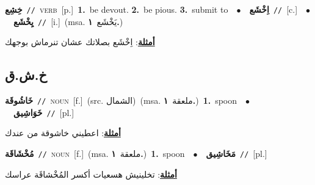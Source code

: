 \documentclass[10pt,a4paper,twoside]{article} %
\begin{document}
\begin{multicols}{2}
{\setlength\topsep{0pt}\textbf{\foreignlanguage{arabic}{خِشِع}}\ {\color{gray}\texttt{//}\color{black}}\ \textsc{verb}\ [p.]\ \textbf{1.}~be devout.  \textbf{2.}~be pious.  \textbf{3.}~submit to\ \ $\bullet$\ \ \setlength\topsep{0pt}\textbf{\foreignlanguage{arabic}{اِخْشَع}}\ {\color{gray}\texttt{//}\color{black}}\ [c.]\ \ $\bullet$\ \ \setlength\topsep{0pt}\textbf{\foreignlanguage{arabic}{يِخْشَع}}\ {\color{gray}\texttt{//}\color{black}}\ [i.]\ \color{gray}(msa. \foreignlanguage{arabic}{يَخْشَع}~\foreignlanguage{arabic}{\textbf{١.}})\color{black}\  \begin{flushright}\color{gray}\foreignlanguage{arabic}{\textbf{\underline{\foreignlanguage{arabic}{أمثلة}}}: اِخْشَع بصلاتك عشان تنرماش بوجهك}\end{flushright}\color{black}} \vspace{2mm}

\vspace{-3mm}
\subsection*{\color{blue}\foreignlanguage{arabic}{خ.ش.ق}\color{blue}{}} 

{\setlength\topsep{0pt}\textbf{\foreignlanguage{arabic}{خَاشُوقَة}}\ {\color{gray}\texttt{//}\color{black}}\ \textsc{noun}\ [f.]\ (src. \color{gray}\foreignlanguage{arabic}{الشمال}\color{black})\ \color{gray}(msa. \foreignlanguage{arabic}{ملعقة}~\foreignlanguage{arabic}{\textbf{١.}})\color{black}\ \textbf{1.}~spoon\ \ $\bullet$\ \ \setlength\topsep{0pt}\textbf{\foreignlanguage{arabic}{خَوَاشِيق}}\ {\color{gray}\texttt{//}\color{black}}\ [pl.]\  \begin{flushright}\color{gray}\foreignlanguage{arabic}{\textbf{\underline{\foreignlanguage{arabic}{أمثلة}}}: اعطيني خاشوقة من عندك}\end{flushright}\color{black}} \vspace{2mm}

{\setlength\topsep{0pt}\textbf{\foreignlanguage{arabic}{مُخْشَاقَة}}\ {\color{gray}\texttt{//}\color{black}}\ \textsc{noun}\ [f.]\ \color{gray}(msa. \foreignlanguage{arabic}{ملعقة}~\foreignlanguage{arabic}{\textbf{١.}})\color{black}\ \textbf{1.}~spoon\ \ $\bullet$\ \ \setlength\topsep{0pt}\textbf{\foreignlanguage{arabic}{مَخَاشِيق}}\ {\color{gray}\texttt{//}\color{black}}\ [pl.]\  \begin{flushright}\color{gray}\foreignlanguage{arabic}{\textbf{\underline{\foreignlanguage{arabic}{أمثلة}}}: تخلينيش هسعيات أكسر المُخْشاقَة عراسك}\end{flushright}\color{black}} \vspace{2mm}


\end{multicols}
\end{document}
